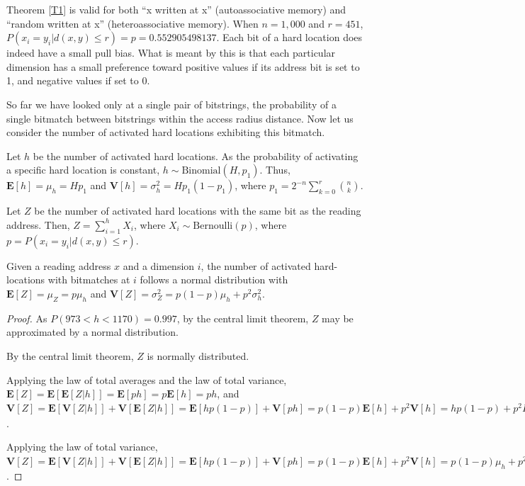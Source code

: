 Theorem \ref{T1} is valid for both ``x written at x'' (autoassociative memory) and ``random written at x'' (heteroassociative memory). When $n=1,000$ and $r=451$, $P(x_i = y_i | d(x, y) \le r) = p = 0.552905498137$.  Each bit of a hard location does indeed have a small pull bias.  What is meant by this is that each particular dimension has a small preference toward positive values if its address bit is set to 1, and negative values if set to 0.

So far we have looked only at a single pair of bitstrings, the probability of a single bitmatch between bitstrings within the access radius distance.  Now let us consider the number of activated hard locations exhibiting this bitmatch.

Let $h$ be the number of activated hard locations. As the probability of activating a specific hard location is constant, $h \sim \text{Binomial}(H, p_1)$. Thus, $\mathbf{E}[h] = \mu_h = Hp_1$ and $\mathbf{V}[h] = \sigma^2_h = Hp_1(1-p_1)$, where $p_1 = 2^{-n} \sum_{k=0}^{r} \binom{n}{k}$.

Let $Z$ be the number of activated hard locations with the same bit as the reading address. Then, $Z = \sum_{i=1}^{h} X_i$, where $X_i \sim \text{Bernoulli}(p)$, where $p = P(x_i = y_i | d(x, y) \le r)$.

\begin{theorem}
Given a reading address $x$ and a dimension $i$, the number of activated hard-locations with bitmatches at $i$ follows a normal distribution with $\mathbf{E}[Z] = \mu_Z = p \mu_h$ and $\mathbf{V}[Z] = \sigma_Z^2 = p(1-p) \mu_h + p^2 \sigma^2_h$.
\label{T2}
\end{theorem}

\begin{proof}
As $P(973 < h < 1170) = 0.997$, by the central limit theorem, $Z$ may be approximated by a normal distribution.

By the central limit theorem, $Z$ is normally distributed.

Applying the law of total averages and the law of total variance, $\mathbf{E}[Z] = \mathbf{E}[\mathbf{E}[Z | h]] = \mathbf{E}[ph] = p \mathbf{E}[h] = ph$, and $\mathbf{V}[Z] = \mathbf{E}[\mathbf{V}[Z|h]] + \mathbf{V}[\mathbf{E}[Z|h]] = \mathbf{E}[hp(1-p)] + \mathbf{V}[ph] = p(1-p) \mathbf{E}[h] + p^2 \mathbf{V}[h] = hp(1-p) + p^2 H p_1 (1-p_1)$.

Applying the law of total variance, $\mathbf{V}[Z] = \mathbf{E}[\mathbf{V}[Z|h]] + \mathbf{V}[\mathbf{E}[Z|h]] = \mathbf{E}[hp(1-p)] + \mathbf{V}[ph] = p(1-p) \mathbf{E}[h] + p^2 \mathbf{V}[h] = p(1-p)\mu_h + p^2 \sigma^2_h$.
\end{proof}


